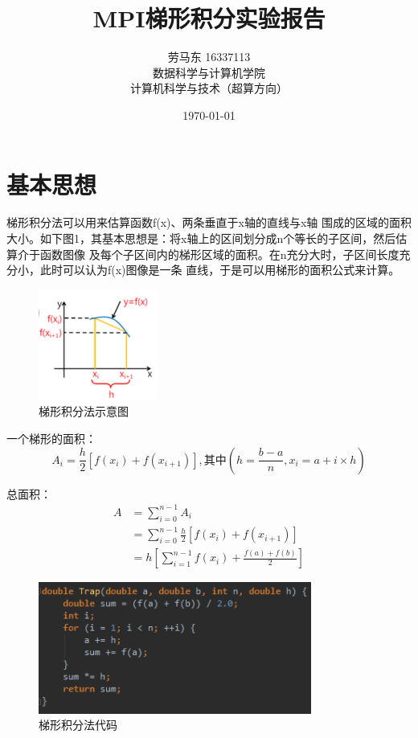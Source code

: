 \documentclass[12pt]{article}
\title{MPI梯形积分实验报告} %
\author{劳马东 \textsc{16337113}\\数据科学与计算机学院\\计算机科学与技术（超算方向）} %
\date{\today} %
\begin{document}
\maketitle %

\section{基本思想}
\qquad 梯形积分法可以用来估算函数f(x)、两条垂直于x轴的直线与x轴
围成的区域的面积大小。如下图1，其基本思想是：将x轴上的区间划分成n个等长的子区间，然后估算介于函数图像
及每个子区间内的梯形区域的面积。在n充分大时，子区间长度充分小，此时可以认为f(x)图像是一条
直线，于是可以用梯形的面积公式来计算。
\begin{figure}[h]
\begin{center}
\includegraphics[width=0.35\textwidth]{p2.png} %
\caption{梯形积分法示意图}
\end{center}
\end{figure}
\newpage
\par \qquad 一个梯形的面积：
\begin{equation}
  A_i = \frac{h}{2}[f(x_i) + f(x_{i+1})],其中(h = \frac{b-a}{n}, x_i=a+i \times h)
\end{equation}
\par \qquad 总面积：
\begin{equation}
  \begin{aligned}
    A &= \sum\limits_{i=0}^{n-1}A_i \\
    &= \sum\limits_{i=0}^{n-1}\frac{h}{2}[f(x_i) + f(x_{i+1})]\\
    &=h[\sum\limits_{i=1}^{n-1}f(x_i) + \frac{f(a)+f(b)}{2}]
  \end{aligned}
\end{equation}

\begin{figure}[h]
\begin{center}
\includegraphics[width=0.8\textwidth]{p3.png} %
\caption{梯形积分法代码}
\end{center}
\end{figure}
\end{document}
